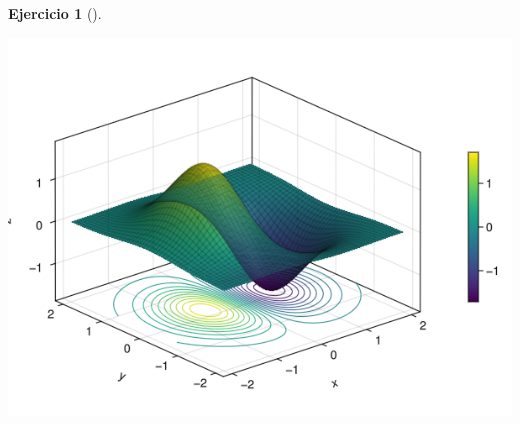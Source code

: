 \documentclass[
  a4paper,
]{scrreport}
\theoremstyle{definition}
\newtheorem{exercise}{Ejercicio}[chapter]
\theoremstyle{remark}
\begin{document}
\begin{exercise}[]
\begin{tcolorbox}
\includegraphics{09-derivadas-funciones-varias-variables_files/figure-pdf/cell-15-output-1.png}

\end{tcolorbox}

\end{exercise}
\end{document}
